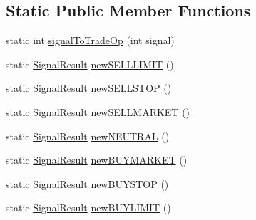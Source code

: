 \subsection*{Static Public Member Functions}
\begin{DoxyCompactItemize}
\item 
static int \hyperlink{class_m_q_l4_c_sharp_1_1_base_1_1_common_1_1_signal_result_afbe52df82b01dcb391a1ad6d2007ad08}{signal\+To\+Trade\+Op} (int signal)
\item 
static \hyperlink{class_m_q_l4_c_sharp_1_1_base_1_1_common_1_1_signal_result}{Signal\+Result} \hyperlink{class_m_q_l4_c_sharp_1_1_base_1_1_common_1_1_signal_result_ad6a6d6e3c286e3338d3933012a78c330}{new\+S\+E\+L\+L\+L\+I\+M\+IT} ()
\item 
static \hyperlink{class_m_q_l4_c_sharp_1_1_base_1_1_common_1_1_signal_result}{Signal\+Result} \hyperlink{class_m_q_l4_c_sharp_1_1_base_1_1_common_1_1_signal_result_a61f110dce8c95abcfbdf021bf24322ee}{new\+S\+E\+L\+L\+S\+T\+OP} ()
\item 
static \hyperlink{class_m_q_l4_c_sharp_1_1_base_1_1_common_1_1_signal_result}{Signal\+Result} \hyperlink{class_m_q_l4_c_sharp_1_1_base_1_1_common_1_1_signal_result_aabd9154d08dca43f1b3234425a157fdb}{new\+S\+E\+L\+L\+M\+A\+R\+K\+ET} ()
\item 
static \hyperlink{class_m_q_l4_c_sharp_1_1_base_1_1_common_1_1_signal_result}{Signal\+Result} \hyperlink{class_m_q_l4_c_sharp_1_1_base_1_1_common_1_1_signal_result_a21143317b0368f3ca835e9f109542fff}{new\+N\+E\+U\+T\+R\+AL} ()
\item 
static \hyperlink{class_m_q_l4_c_sharp_1_1_base_1_1_common_1_1_signal_result}{Signal\+Result} \hyperlink{class_m_q_l4_c_sharp_1_1_base_1_1_common_1_1_signal_result_ad37ad4ea6429402af35625d8c9efca63}{new\+B\+U\+Y\+M\+A\+R\+K\+ET} ()
\item 
static \hyperlink{class_m_q_l4_c_sharp_1_1_base_1_1_common_1_1_signal_result}{Signal\+Result} \hyperlink{class_m_q_l4_c_sharp_1_1_base_1_1_common_1_1_signal_result_a954d5bce2dfd8aae3d408eb5e6658f3b}{new\+B\+U\+Y\+S\+T\+OP} ()
\item 
static \hyperlink{class_m_q_l4_c_sharp_1_1_base_1_1_common_1_1_signal_result}{Signal\+Result} \hyperlink{class_m_q_l4_c_sharp_1_1_base_1_1_common_1_1_signal_result_a3626447dfe4a09c961d6c4e29c3688e2}{new\+B\+U\+Y\+L\+I\+M\+IT} ()
\end{DoxyCompactItemize}
